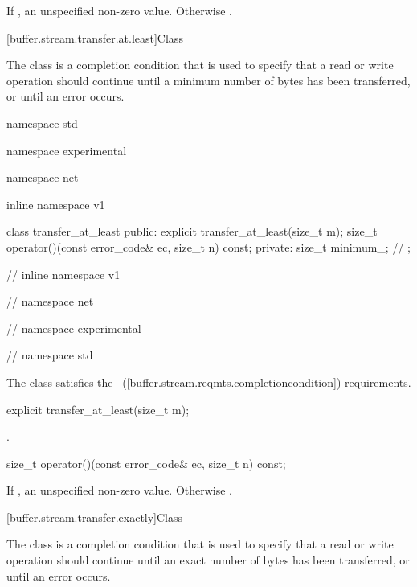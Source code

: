 \begin{itemdescr}
\pnum
\returns If , an unspecified non-zero value. Otherwise .
\end{itemdescr}



[buffer.stream.transfer.at.least]{Class }

%
\pnum
The class  is a completion condition that is used to specify that a read or write operation should continue until a minimum number of bytes has been transferred, or until an error occurs.

\begin{codeblock}
namespace std {
namespace experimental {
namespace net {
inline namespace v1 {

  class transfer_at_least
  {
  public:
    explicit transfer_at_least(size_t m);
    size_t operator()(const error_code& ec, size_t n) const;
  private:
    size_t minimum_; // \expos
  };

} // inline namespace v1
} // namespace net
} // namespace experimental
} // namespace std
\end{codeblock}

\pnum
The class  satisfies the ~(\ref{buffer.stream.reqmts.completioncondition}) requirements.

\begin{itemdecl}
explicit transfer_at_least(size_t m);
\end{itemdecl}

\begin{itemdescr}
\pnum
\postconditions {}.
\end{itemdescr}

\begin{itemdecl}
size_t operator()(const error_code& ec, size_t n) const;
\end{itemdecl}

\begin{itemdescr}
\pnum
\returns If , an unspecified non-zero value. Otherwise .
\end{itemdescr}



[buffer.stream.transfer.exactly]{Class }

%
\pnum
The class  is a completion condition that is used to specify that a read or write operation should continue until an exact number of bytes has been transferred, or until an error occurs.


